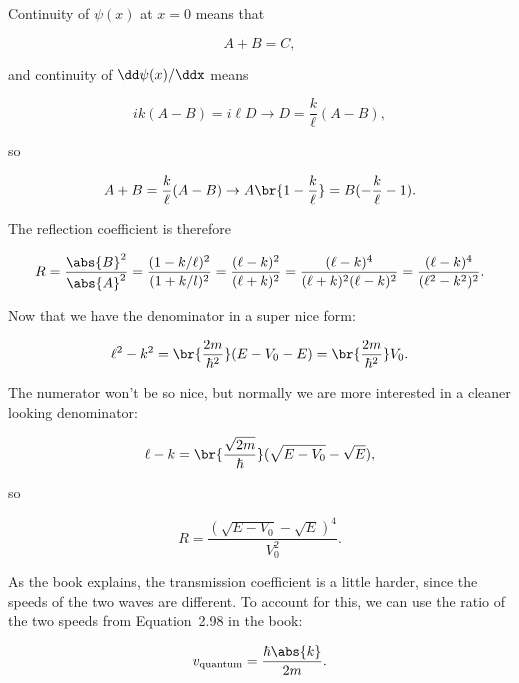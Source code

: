 \begin{parts}
Continuity of $\psi(x)$ at $x=0$ means that

\begin{equation}
    A+B=C,
\end{equation}

and continuity of $\dd\psi(x)/\ddx$ means

\begin{equation*}
    ik(A-B) = i\ell D \rightarrow D = \frac{k}{\ell}(A-B),
\end{equation*}

so

\begin{equation*}
    A+B = \frac{k}{\ell}(A-B) \rightarrow A\br{1 - \frac{k}{\ell}} = B(-\frac{k}{\ell} - 1).
\end{equation*}

The reflection coefficient is therefore

\begin{equation*}
    R = \frac{\abs{B}^2}{\abs{A}^2} = \frac{(1 - k/\ell)^2}{(1 + k/l)^2} = \frac{(\ell - k)^2}{(\ell + k)^2} = \frac{(\ell - k)^4}{(\ell + k)^2(\ell - k)^2} = \frac{(\ell - k)^4}{(\ell^2 - k^2)^2}.
\end{equation*}

Now that we have the denominator in a super nice form:

\begin{equation*}
    \ell^2 - k^2 = \br{\frac{2m}{\hbar^2}}(E - V_0 - E) = \br{\frac{2m}{\hbar^2}}V_0.
\end{equation*}

The numerator won't be so nice, but normally we are more interested in a cleaner looking denominator:

\begin{equation*}
    \ell - k = \br{\frac{\sqrt{2m}}{\hbar}}(\sqrt{E-V_0} - \sqrt{E}),
\end{equation*}

so

\begin{equation*}
    R = \frac{(\sqrt{E-V_0} - \sqrt{E})^4}{V_0^2}.
\end{equation*}




\item As the book explains, the transmission coefficient is a little harder, since the speeds of the two waves are different. To account for this, we can use the ratio of the two speeds from Equation~2.98 in the book:

\begin{equation}
    v_{\mathrm{quantum}} = \frac{\hbar\abs{k}}{2m}.
\end{equation}


\end{parts}
